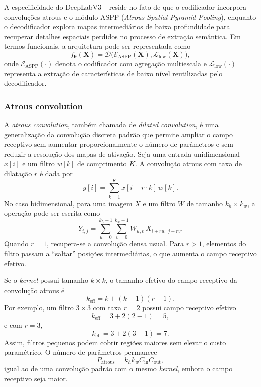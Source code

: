 \documentclass[tcc,capa]{texufpel}
\begin{document}
A especificidade do DeepLabV3+ reside no fato de que o codificador incorpora convoluções atrous e o módulo ASPP (\textit{Atrous Spatial Pyramid Pooling}), enquanto o decodificador explora mapas intermediários de baixa profundidade para recuperar detalhes espaciais perdidos no processo de extração semântica. Em termos funcionais, a arquitetura pode ser representada como
\begin{equation}
	f_{\boldsymbol{\theta}}(\mathbf{X})
	=
	\mathcal{D}
	\Big(
	\mathcal{E}_{\text{ASPP}}
	(\mathbf{X})
	,
	\mathcal{L}_{\text{low}}(\mathbf{X})
	\Big),
\end{equation}
onde \(\mathcal{E}_{\text{ASPP}}(\cdot)\) denota o codificador com agregação multiescala e \(\mathcal{L}_{\text{low}}(\cdot)\) representa a extração de características de baixo nível reutilizadas pelo decodificador.

\subsubsection{Atrous convolution}

A \textit{atrous convolution}, também chamada de \textit{dilated convolution}, é uma generalização da convolução discreta padrão que permite ampliar o campo receptivo sem aumentar proporcionalmente o número de parâmetros e sem reduzir a resolução dos mapas de ativação. Seja uma entrada unidimensional \(x[i]\) e um filtro \(w[k]\) de comprimento \(K\). A convolução atrous com taxa de dilatação \(r\) é dada por
\begin{equation}
	y[i] = \sum_{k=1}^{K} x[i + r\cdot k]\, w[k].
\end{equation}
No caso bidimensional, para uma imagem \(X\) e um filtro \(W\) de tamanho \(k_h \times k_w\), a operação pode ser escrita como
\begin{equation}
	Y_{i,j}
	=
	\sum_{u=0}^{k_h-1}\sum_{v=0}^{k_w-1}
	W_{u,v}\,
	X_{i + r u,\; j + r v}.
\end{equation}
Quando \(r=1\), recupera-se a convolução densa usual. Para \(r>1\), elementos do filtro passam a ``saltar'' posições intermediárias, o que aumenta o campo receptivo efetivo.

Se o \textit{kernel} possui tamanho \(k \times k\), o tamanho efetivo do campo receptivo da convolução atrous é
\begin{equation}
	k_{\text{eff}} = k + (k-1)(r-1).
\end{equation}
Por exemplo, um filtro \(3\times3\) com taxa \(r=2\) possui campo receptivo efetivo
\begin{equation}
	k_{\text{eff}} = 3 + 2(2-1) = 5,
\end{equation}
e com \(r=3\),
\begin{equation}
	k_{\text{eff}} = 3 + 2(3-1) = 7.
\end{equation}
Assim, filtros pequenos podem cobrir regiões maiores sem elevar o custo paramétrico. O número de parâmetros permanece
\begin{equation}
	P_{\text{atrous}} = k_h k_w C_{\text{in}} C_{\text{out}},
\end{equation}
igual ao de uma convolução padrão com o mesmo \textit{kernel}, embora o campo receptivo seja maior.
\end{document}
